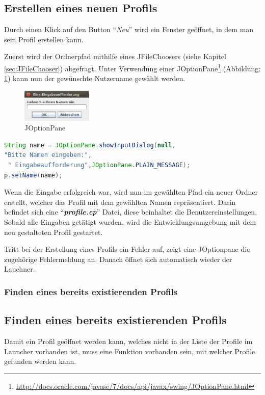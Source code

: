 	\subsection{Erstellen eines neuen Profils}
\fi
Durch einen Klick auf den Button "`\textit{Neu}"' wird ein Fenster geöffnet, in dem man sein Profil erstellen kann.  

Zuerst wird der Ordnerpfad mithilfe eines JFileChoosers (siehe Kapitel \ref{sec:JFileChooser}) abgefragt. Unter Verwendung einer JOptionPane\footnote{\url{http://docs.oracle.com/javase/7/docs/api/javax/swing/JOptionPane.html}}  (Abbildung: \ref{fig:JOptionPane}) kann nun der gewünschte Nutzername gewählt werden.
\begin{figure}[h] 
   \centering
     \includegraphics[width=0.3\textwidth]{./media/images/gui/launcher/JOptionPane.png}
  \caption{JOptionPane}
  \label{fig:JOptionPane}
\end{figure}

\begin{lstlisting}[language=JAVA]
String name = JOptionPane.showInputDialog(null,
"Bitte Namen eingeben:",
 " Eingabeaufforderung",JOptionPane.PLAIN_MESSAGE);
p.setName(name);
\end{lstlisting}

Wenn die Eingabe erfolgreich war, wird nun im gewählten Pfad ein neuer Ordner erstellt, welcher das Profil mit dem gewählten Namen repräsentiert. Darin befindet sich eine "`\textit{\textbf{profile.cp}}"' Datei, diese beinhaltet die Benutzereinstellungen. Sobald alle Eingaben getätigt wurden, wird die Entwicklungsumgebung mit dem neu gestalteten Profil gestartet.

Tritt bei der Erstellung eines Profils ein Fehler auf, zeigt eine JOptionpane die zugehörige Fehlermeldung an. Danach öffnet sich automatisch wieder der Lauchner. 

\iffabian
	\subsubsection*{Finden eines bereits existierenden Profils}
\else
	\subsection{Finden eines bereits existierenden Profils}
\fi
Damit ein Profil geöffnet werden kann, welches nicht in der Liste der Profile im Launcher vorhanden ist, muss eine Funktion vorhanden sein, mit welcher Profile gefunden werden kann.

